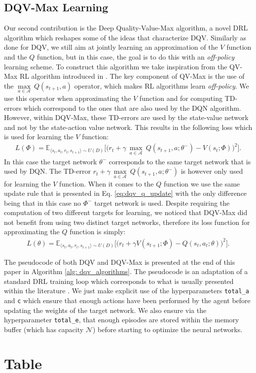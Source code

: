 \subsection{DQV-Max Learning}
Our second contribution is the Deep Quality-Value-Max algorithm, a novel DRL algorithm which reshapes some of the ideas that characterize DQV. Similarly as done for DQV, we still aim at jointly learning an approximation of the $V$ function and the $Q$ function, but in this case, the goal is to do this with an \textit{off-policy} learning scheme. To construct this algorithm we take inspiration from the QV-Max RL algorithm introduced in \cite{wiering2009qv}. The key component of QV-Max is the use of the $\underset{a\in \mathcal{A}}{\max}\: Q(s_{t+1}, a)$ operator, which makes RL algorithms learn \textit{off-policy}. We use this operator when approximating the $V$ function and for computing TD-errors which correspond to the ones that are also used by the DQN algorithm. However, within DQV-Max, these TD-errors are used by the state-value network and not by the state-action value network. This results in the following loss which is used for learning the $V$ function:
\begin{multline}
L(\Phi) = \mathds{E}_{\langle s_{t},a_{t},r_{t},s_{t+1}\rangle\sim U(D)} \bigg[\big(r_{t} + \gamma \: \underset{a\in \mathcal{A}}{\max}\: Q(s_{t+1}, a; \theta^{-}) - V(s_{t}; \Phi)\big)^{2}\bigg].
\label{eq:dqv_max_v}
\end{multline}
In this case the target network $\theta^{-}$ corresponds to the same target network that is used by DQN. The TD-error $r_{t} + \gamma \: \underset{a\in \mathcal{A}}{\max}\: Q(s_{t+1}, a; \theta^{-})$ is however only used for learning the $V$ function. When it comes to the $Q$ function we use the same update rule that is presented in Eq. \ref{eq:dqv_q_update} with the only difference being that in this case no $\Phi^{-}$ target network is used. Despite requiring the computation of two different targets for learning, we noticed that DQV-Max did not benefit from using two distinct target networks, therefore its loss function for approximating the $Q$ function is simply:
\begin{multline}
    L(\theta) = \mathds{E}_{\langle s_{t},a_{t},r_{t},s_{t+1}\rangle\sim U(D)} \bigg[\big(r_{t} + \gamma V(s_{t+1}; \Phi) - Q(s_{t}, a_{t}; \theta)\big)^{2}\bigg].
    \label{eq:dqv_max_q}
\end{multline}

The pseudocode of both DQV and DQV-Max is presented at the end of this paper in Algorithm \ref{alg: dqv_algorithms}. The pseudocode is an adaptation of a standard DRL training loop which corresponds to what is usually presented within the literature \cite{mnih2015human}. We just make explicit use of the hyperparameters \texttt{total\_a} and \texttt{c} which ensure that enough actions have been performed by the agent before updating the weights of the target network. We also ensure via the hyperparameter \texttt{total\_e}, that enough episodes are stored within the memory buffer (which has capacity $\mathcal{N}$) before starting to optimize the neural networks. 

\section{Table}

